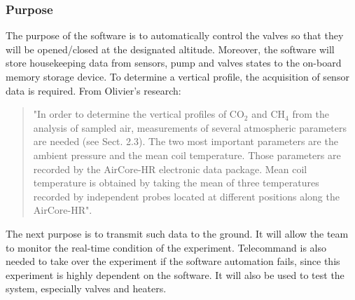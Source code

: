 \documentclass[a4paper,12pt,twoside]{article}
\begin{document}
\subsubsection{Purpose}
The purpose of the software is to automatically control the valves so that they will be opened/closed at the designated altitude. Moreover, the software will store housekeeping data from sensors, pump and valves states to the on-board memory storage device. To determine a vertical profile, the acquisition of sensor data is required. From Olivier's research:
\begin{quote}
"In order to determine the vertical profiles of CO$_2$ and CH$_4$ from the analysis of sampled air, measurements of several atmospheric parameters are needed (see Sect. 2.3). The two most important parameters are the ambient pressure and the mean coil temperature. Those parameters are recorded by the AirCore-HR electronic data package. Mean coil temperature is obtained by taking the mean of three temperatures recorded by independent probes located at different positions along the AirCore-HR".\cite{Olivier}
\end{quote}
The next purpose is to transmit such data to the ground. It will allow the team to monitor the real-time condition of the experiment. Telecommand is also needed to take over the experiment if the software automation fails, since this experiment is highly dependent on the software. It will also be used to test the system, especially valves and heaters.\par
\end{document}

